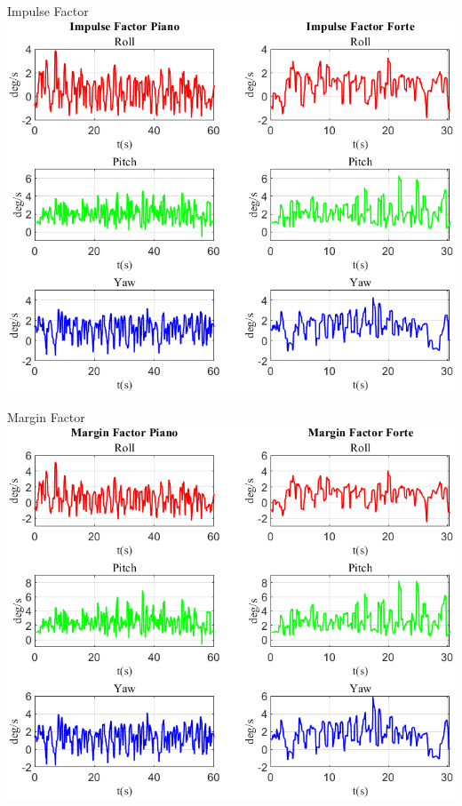 	\begin{frame}{{Impulse Factor}}
		\centering\includegraphics[height=.8\textheight]{figure/VAng/Impulse Factor}
	\end{frame}
	
	\begin{frame}{{Margin Factor}}
		\centering\includegraphics[height=.8\textheight]{figure/VAng/Margin Factor}
	\end{frame}
	

